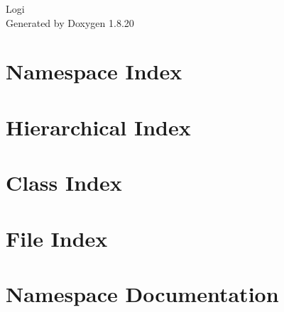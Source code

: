 \let\mypdfximage\pdfximage\def\pdfximage{\immediate\mypdfximage}\documentclass[twoside]{book}
\newcommand{\+}{\discretionary{\mbox{\scriptsize$\hookleftarrow$}}{}{}}
\newcommand{\clearemptydoublepage}{%
  \newpage{\pagestyle{empty}\cleardoublepage}%
}
\begin{document}
\hypersetup{pageanchor=false,
             bookmarksnumbered=true,
             pdfencoding=unicode
            }
\begin{titlepage}
\vspace*{7cm}
\begin{center}%
{\Large Logi }\\
\vspace*{1cm}
{\large Generated by Doxygen 1.8.20}\\
\end{center}
\end{titlepage}
\clearemptydoublepage
{}
\tableofcontents
\clearemptydoublepage
{}
\hypersetup{pageanchor=true}

\chapter{Namespace Index}

\chapter{Hierarchical Index}

\chapter{Class Index}

\chapter{File Index}

\chapter{Namespace Documentation}

\end{document}
